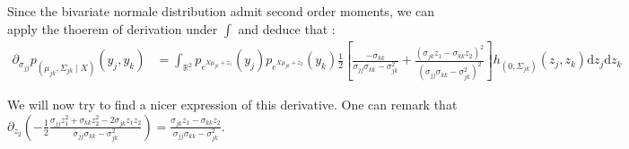 \documentclass[11pt, a4paper]{article}
\begin{document}
Since the bivariate normale distribution admit second order moments, we can apply  the thoerem of derivation under $\int$ and deduce that :
\begin{align*}
\partial_{\sigma_{jj}} p_{(\mu_{jk},\Sigma_{jk} \mid X)}(y_j,y_k) &=\int_{\mathbb{R}^2} p_{e^{X\mu_{jk}+z_1}}(y_j) p_{e^{X\mu_{jk}+z_2}}(y_k)\frac{1}{2} [ \frac{-\sigma_{kk}}{\sigma_{jj} \sigma_{kk}-\sigma_{jk}^2} +  \frac{(\sigma_{jk} z_1 - \sigma_{kk} z_2)^2}{(\sigma_{jj} \sigma_{kk}-\sigma_{jk}^2)^2}  ] h_{(0,\Sigma_{jk})}(z_j,z_k) \mathrm{d}z_j \mathrm{d}z_k
\end{align*}

\noindent We will now try to find a nicer expression of this derivative. One can remark that $\partial_{z_2} (-\frac{1}{2} \frac{\sigma_{jj} z_1^2 + \sigma_{kk} z_2^2 -2 \sigma_{jk} z_1 z_2}{\sigma_{jj} \sigma_{kk}-\sigma_{jk}^2}) = \frac{\sigma_{jk} z_1 - \sigma_{kk} z_2}{\sigma_{jj} \sigma_{kk}-\sigma_{jk}^2}$.
\end{document}
